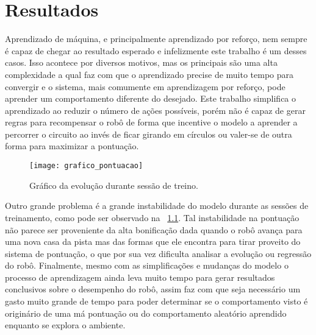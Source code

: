 

\chapter{Resultados}
\label{cap:resultados}

Aprendizado de máquina, e principalmente aprendizado por reforço, nem sempre é capaz de chegar ao resultado esperado e infelizmente este trabalho é um desses casos. Isso acontece por diversos motivos, mas os principais são uma alta complexidade a qual faz com que o aprendizado precise de muito tempo para convergir e o sistema, mais comumente em aprendizagem por reforço, pode aprender um comportamento diferente do desejado. Este trabalho simplifica o aprendizado ao reduzir o número de ações possíveis, porém não é capaz de gerar regras para recompensar o robô de forma que incentive o modelo a aprender a percorrer o circuito ao invés de ficar girando em círculos ou valer-se de outra forma para maximizar a pontuação.

\begin{figure}
	\centering
	\texttt{[image: grafico\_pontuacao]}
	\caption{Gráfico da evolução durante sessão de treino. \label{fig:grafico_pontuacao}}
\end{figure}

Outro grande problema é a grande instabilidade do modelo durante as sessões de treinamento, como pode ser observado na ~\ref{fig:grafico_pontuacao}. Tal instabilidade na pontuação não parece ser proveniente da alta bonificação dada quando o robô avança para uma nova casa da pista mas das formas que ele encontra para tirar proveito do sistema de pontuação, o que por sua vez dificulta analisar a evolução ou regressão do robô. Finalmente, mesmo com as simplificações e mudanças do modelo o processo de aprendizagem ainda leva muito tempo para gerar resultados conclusivos sobre o desempenho do robô, assim faz com que seja necessário um gasto muito grande de tempo para poder determinar se o comportamento visto é originário de uma má pontuação ou do comportamento aleatório aprendido enquanto se explora o ambiente.
